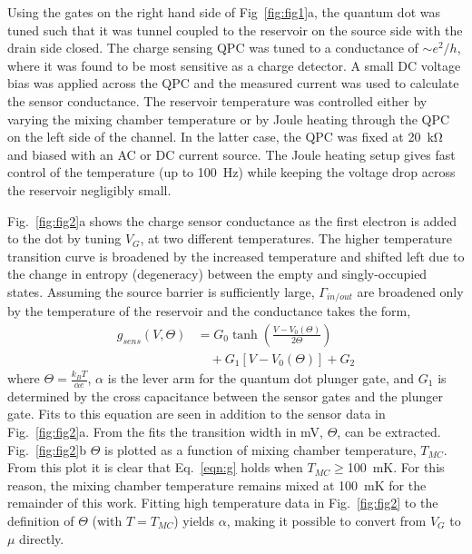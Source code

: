 \documentclass[twocolumn,showpacs,preprintnumbers,amsmath,amssymb,pra,aps,superscriptaddress]{revtex4-1}
\begin{document}
Using the gates on the right hand side of Fig~\ref{fig:fig1}a, the quantum dot was tuned such that it was tunnel coupled to the reservoir on the source side with the drain side closed. The charge sensing QPC was tuned to a conductance of ${\sim}e^2/h$, where it was found to be most sensitive as a charge detector. A small DC voltage bias was applied across the QPC and the measured current was used to calculate the sensor conductance. The reservoir temperature was controlled either by varying the mixing chamber temperature or by Joule heating through the QPC on the left side of the channel. In the latter case, the QPC was fixed at \SI{20}{\kilo\ohm} and biased with an AC or DC current source. The Joule heating setup gives fast control of the temperature (up to \SI{100}{\hertz}) while keeping the voltage drop across the reservoir negligibly small.

Fig.~\ref{fig:fig2}a shows the charge sensor conductance as the first electron is added to the dot by tuning $V_G$, at two different temperatures. The higher temperature transition curve is broadened by the increased temperature and shifted left due to the change in entropy (degeneracy)  between the empty and singly-occupied states. Assuming the source barrier is sufficiently large, $\Gamma_{in/out}$ are broadened only by the temperature of the reservoir and the conductance takes the form,
%
\begin{align}
\label{eqn:g}
        g_{sens}(V,\Theta) &= G_0 \tanh\left(\frac{V-V_0(\Theta)}{2\Theta}\right)  \\
                        &\quad + G_1\left[V-V_0(\Theta)\right] + G_2 \nonumber
\end{align}
%
where $\Theta = \frac{k_B T}{\alpha e}$, $\alpha$ is the lever arm for the quantum dot plunger gate, and $G_1$ is determined by the cross capacitance between the sensor gates and the plunger gate. Fits to this equation are seen in addition to the sensor data in Fig.~\ref{fig:fig2}a. From the fits the transition width in mV, $\Theta$, can be extracted. Fig.~\ref{fig:fig2}b $\Theta$ is plotted as a function of mixing chamber temperature, $T_{MC}$. From this plot it is clear that Eq.~\ref{eqn:g} holds when $T_{MC}\geq$\SI{100}{\milli\kelvin}. For this reason, the mixing chamber temperature remains mixed at \SI{100}{\milli\kelvin} for the remainder of this work. Fitting high temperature data in Fig.~\ref{fig:fig2} to the definition of $\Theta$ (with $T=T_{MC}$) yields $\alpha$, making it possible to convert from $V_G$ to $\mu$ directly.
\end{document}

